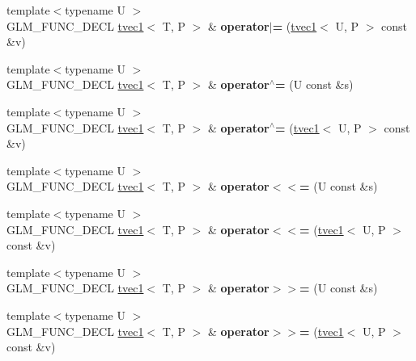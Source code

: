 \begin{DoxyCompactItemize}
\item 
\hypertarget{structglm_1_1tvec1_a6c8723729c52dbf1511bb50723f686c0}{{\footnotesize template$<$typename U $>$ }\\G\-L\-M\-\_\-\-F\-U\-N\-C\-\_\-\-D\-E\-C\-L \hyperlink{structglm_1_1tvec1}{tvec1}$<$ T, P $>$ \& {\bfseries operator$\vert$=} (\hyperlink{structglm_1_1tvec1}{tvec1}$<$ U, P $>$ const \&v)}\label{structglm_1_1tvec1_a6c8723729c52dbf1511bb50723f686c0}

\item 
\hypertarget{structglm_1_1tvec1_aed79da02faf88bada2d178bd2c2c9072}{{\footnotesize template$<$typename U $>$ }\\G\-L\-M\-\_\-\-F\-U\-N\-C\-\_\-\-D\-E\-C\-L \hyperlink{structglm_1_1tvec1}{tvec1}$<$ T, P $>$ \& {\bfseries operator$^\wedge$=} (U const \&s)}\label{structglm_1_1tvec1_aed79da02faf88bada2d178bd2c2c9072}

\item 
\hypertarget{structglm_1_1tvec1_abc6f6df2f1164cb293976e0418e44690}{{\footnotesize template$<$typename U $>$ }\\G\-L\-M\-\_\-\-F\-U\-N\-C\-\_\-\-D\-E\-C\-L \hyperlink{structglm_1_1tvec1}{tvec1}$<$ T, P $>$ \& {\bfseries operator$^\wedge$=} (\hyperlink{structglm_1_1tvec1}{tvec1}$<$ U, P $>$ const \&v)}\label{structglm_1_1tvec1_abc6f6df2f1164cb293976e0418e44690}

\item 
\hypertarget{structglm_1_1tvec1_accd381f8f7a416463983422443324826}{{\footnotesize template$<$typename U $>$ }\\G\-L\-M\-\_\-\-F\-U\-N\-C\-\_\-\-D\-E\-C\-L \hyperlink{structglm_1_1tvec1}{tvec1}$<$ T, P $>$ \& {\bfseries operator$<$$<$=} (U const \&s)}\label{structglm_1_1tvec1_accd381f8f7a416463983422443324826}

\item 
\hypertarget{structglm_1_1tvec1_a2ed7c375c837621c846ee0b31104e34a}{{\footnotesize template$<$typename U $>$ }\\G\-L\-M\-\_\-\-F\-U\-N\-C\-\_\-\-D\-E\-C\-L \hyperlink{structglm_1_1tvec1}{tvec1}$<$ T, P $>$ \& {\bfseries operator$<$$<$=} (\hyperlink{structglm_1_1tvec1}{tvec1}$<$ U, P $>$ const \&v)}\label{structglm_1_1tvec1_a2ed7c375c837621c846ee0b31104e34a}

\item 
\hypertarget{structglm_1_1tvec1_a604466779f4723d65def8bff99bdde6a}{{\footnotesize template$<$typename U $>$ }\\G\-L\-M\-\_\-\-F\-U\-N\-C\-\_\-\-D\-E\-C\-L \hyperlink{structglm_1_1tvec1}{tvec1}$<$ T, P $>$ \& {\bfseries operator$>$$>$=} (U const \&s)}\label{structglm_1_1tvec1_a604466779f4723d65def8bff99bdde6a}

\item 
\hypertarget{structglm_1_1tvec1_ac7b30c3a71fc6b28c4bceae5a0e92057}{{\footnotesize template$<$typename U $>$ }\\G\-L\-M\-\_\-\-F\-U\-N\-C\-\_\-\-D\-E\-C\-L \hyperlink{structglm_1_1tvec1}{tvec1}$<$ T, P $>$ \& {\bfseries operator$>$$>$=} (\hyperlink{structglm_1_1tvec1}{tvec1}$<$ U, P $>$ const \&v)}\label{structglm_1_1tvec1_ac7b30c3a71fc6b28c4bceae5a0e92057}

\end{DoxyCompactItemize}

